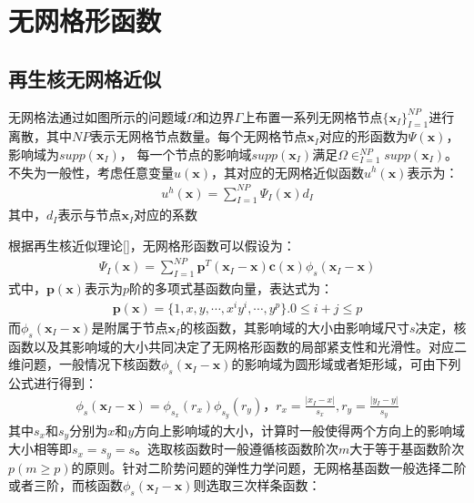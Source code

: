 \documentclass[a4paper]{ctexbook}
\begin{document}
\chapter{无网格形函数}
\section{再生核无网格近似}
无网格法通过如图所示的问题域$\Omega$和边界$\Gamma$上布置一系列无网格节点$\{\pmb{x}_I\}^{N\!P}_{I=1}$进行离散，其中$N\!P$表示无网格节点数量。每个无网格节点$\pmb{x}_I$对应的形函数为$\Psi(\pmb{x})$，影响域为$supp(\pmb{x}_I)$，
每一个节点的影响域$supp(\pmb{x}_I)$满足$\Omega\in^{N\!P}_{I=1}supp(\pmb{x}_I)$。不失为一般性，考虑任意变量$u(\pmb{x})$，其对应的无网格近似函数$u^h(\pmb{x})$表示为：
\begin{equation}
\begin{split}
    u^h(\pmb{x})=\sum_{I=1}^{N\!P}\Psi_I(\pmb{x})d_I
\end{split}
\end{equation}
其中，$d_I$表示与节点$\pmb{x}_I$对应的系数\par
根据再生核近似理论[]，无网格形函数可以假设为：
\begin{equation}
\begin{split}
    \Psi_I(\pmb{x})=\sum_{I=1}^{N\!P}\pmb{p}^T(\pmb{x}_I-\pmb{x})\pmb{c}(\pmb{x})\phi_s(\pmb{x}_I-\pmb{x})
\end{split}
\end{equation}
式中，$\pmb{p}(\pmb{x})$表示为$p$阶的多项式基函数向量，表达式为：
\begin{equation}
\begin{split}
    \pmb{p}(\pmb{x})=\{1,x,y,\dotsb,x^iy^i,\dotsb,y^p\}.0\le i+j \le p
\end{split}
\end{equation}
而$\phi_s(\pmb{x}_I-\pmb{x})$是附属于节点$\pmb{x}_I$的核函数，其影响域的大小由影响域尺寸$s$决定，核函数以及其影响域的大小共同决定了无网格形函数的局部紧支性和光滑性。对应二维问题，一般情况下核函数$\phi_s(\pmb{x}_I-\pmb{x})$的影响域为圆形域或者矩形域，可由下列公式进行得到：
\begin{equation}
\begin{split}
    \phi_s(\pmb{x}_I-\pmb{x})=\phi_{s_x}(r_x)\phi_{s_y}(r_y)，r_x=\frac{\lvert x_I-x\rvert}{s_x},r_y=\frac{\lvert y_I-y \rvert}{s_y}
\end{split}
\end{equation}
其中$s_x$和$s_y$分别为$x$和$y$方向上影响域的大小，计算时一般使得两个方向上的影响域大小相等即$s_x=s_y=s$。选取核函数时一般遵循核函数阶次$m$大于等于基函数阶次$p(m\ge p)$的原则。针对二阶势问题的弹性力学问题，无网格基函数一般选择二阶或者三阶，而核函数$\phi_s(\pmb{x}_I-\pmb{x})$则选取三次样条函数：
\end{document}

